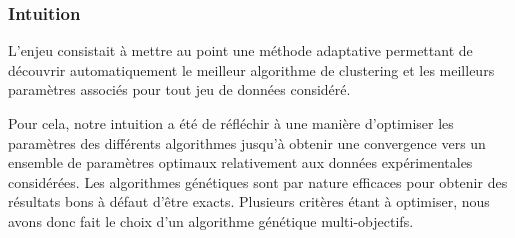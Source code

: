 \documentclass{llncs}
\begin{document}







\subsubsection{Intuition}

L'enjeu consistait à mettre au point une méthode adaptative permettant de découvrir automatiquement le meilleur algorithme de clustering et les meilleurs paramètres associés pour tout jeu de données considéré.

Pour cela, notre intuition a été de réfléchir à une manière d'optimiser les paramètres des différents algorithmes jusqu'à obtenir une convergence vers un ensemble de paramètres optimaux relativement aux données expérimentales considérées.
Les algorithmes génétiques sont par nature efficaces pour obtenir des résultats bons à défaut d'être exacts.
Plusieurs critères étant à optimiser, nous avons donc fait le choix d'un algorithme génétique multi-objectifs.
\end{document}
